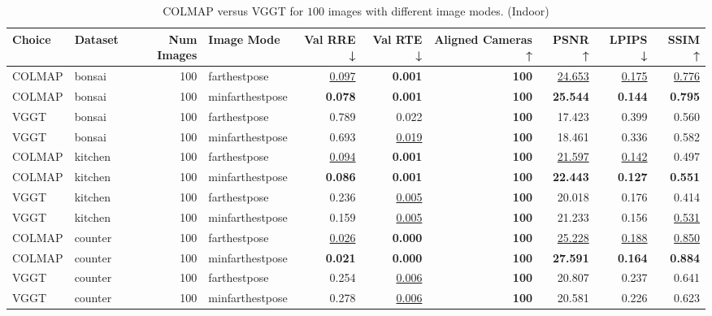 \begin{table}[H]
\caption{\ifdefined\customcaption \customcaption \else COLMAP versus VGGT for $100$ images with different image modes. (Indoor) \fi}
\label{tab:01_image_mode_dense_indoor}
\centering
\scriptsize
\begin{tabular}{llrlrrrrrr}
\toprule
Choice & Dataset & Num Images & Image Mode & Val RRE ↓ & Val RTE ↓ & Aligned Cameras ↑ & PSNR ↑ & LPIPS ↓ & SSIM ↑ \\
\midrule
COLMAP & bonsai & 100 & farthestpose & \underline{0.097} & \textbf{0.001} & \textbf{100} & \underline{24.653} & \underline{0.175} & \underline{0.776} \\
COLMAP & bonsai & 100 & minfarthestpose & \textbf{0.078} & \textbf{0.001} & \textbf{100} & \textbf{25.544} & \textbf{0.144} & \textbf{0.795} \\
VGGT & bonsai & 100 & farthestpose & 0.789 & 0.022 & \textbf{100} & 17.423 & 0.399 & 0.560 \\
VGGT & bonsai & 100 & minfarthestpose & 0.693 & \underline{0.019} & \textbf{100} & 18.461 & 0.336 & 0.582 \\
\midrule
COLMAP & kitchen & 100 & farthestpose & \underline{0.094} & \textbf{0.001} & \textbf{100} & \underline{21.597} & \underline{0.142} & 0.497 \\
COLMAP & kitchen & 100 & minfarthestpose & \textbf{0.086} & \textbf{0.001} & \textbf{100} & \textbf{22.443} & \textbf{0.127} & \textbf{0.551} \\
VGGT & kitchen & 100 & farthestpose & 0.236 & \underline{0.005} & \textbf{100} & 20.018 & 0.176 & 0.414 \\
VGGT & kitchen & 100 & minfarthestpose & 0.159 & \underline{0.005} & \textbf{100} & 21.233 & 0.156 & \underline{0.531} \\
\midrule
COLMAP & counter & 100 & farthestpose & \underline{0.026} & \textbf{0.000} & \textbf{100} & \underline{25.228} & \underline{0.188} & \underline{0.850} \\
COLMAP & counter & 100 & minfarthestpose & \textbf{0.021} & \textbf{0.000} & \textbf{100} & \textbf{27.591} & \textbf{0.164} & \textbf{0.884} \\
VGGT & counter & 100 & farthestpose & 0.254 & \underline{0.006} & \textbf{100} & 20.807 & 0.237 & 0.641 \\
VGGT & counter & 100 & minfarthestpose & 0.278 & \underline{0.006} & \textbf{100} & 20.581 & 0.226 & 0.623 \\
\bottomrule
\end{tabular}
\end{table}